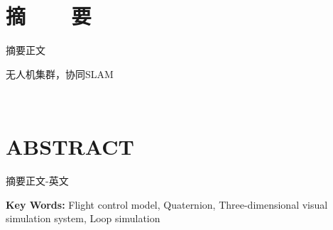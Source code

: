 

\renewcommand{\baselinestretch}{1.5}
\fontsize{12pt}{13pt} \selectfont

\chapter*{摘~~~~要}

\vspace{1em}

摘要正文

\vspace{0.1in}
 无人机集群，协同SLAM


﻿﻿


\chapter*{ABSTRACT}
\noindent 
\vspace{1em}


摘要正文-英文



\vspace{0.1in}
\noindent \textbf{Key Words:} Flight control model, Quaternion, Three-dimensional visual simulation system, Loop simulation
